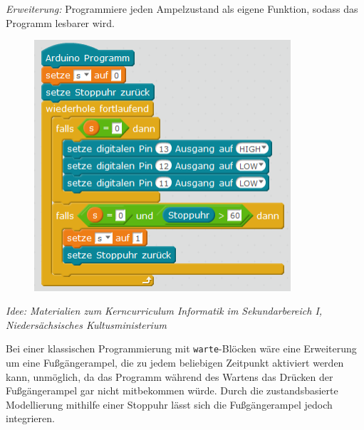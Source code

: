 \begin{aufgabe}
\begin{enumerate}[label=\alph*), itemsep=0mm, parsep=0mm]
		\emph{Erweiterung:} Programmiere jeden Ampelzustand als eigene Funktion, sodass das Programm lesbarer wird.
		\begin{figure}[H]
			\centering
			\includegraphics[width=0.85\textwidth]{./pics/ampel-automat-start.png}
		\end{figure} 
	\end{enumerate}
	{\scriptsize\emph{Idee: Materialien zum Kerncurriculum Informatik im Sekundarbereich I, Niedersächsisches Kultusministerium}}
\end{aufgabe}

Bei einer klassischen Programmierung mit \texttt{warte}-Blöcken wäre eine Erweiterung um eine Fußgängerampel, die zu jedem beliebigen Zeitpunkt aktiviert werden kann, unmöglich, da das Programm während des Wartens das Drücken der Fußgängerampel gar nicht mitbekommen würde. Durch die zustandsbasierte Modellierung mithilfe einer Stoppuhr lässt sich die Fußgängerampel jedoch integrieren. 

